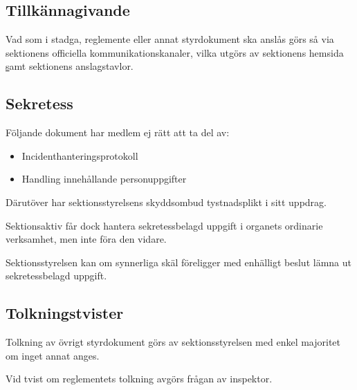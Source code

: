 \documentclass{styrdokument}
\begin{document}
\subsection{Tillkännagivande}
\? Vad som i stadga, reglemente eller annat styrdokument ska anslås görs så via sektionens officiella kommunikationskanaler, vilka utgörs av sektionens hemsida \href{ftek.se} samt sektionens anslagstavlor.

\subsection{Sekretess}
\? Följande dokument har medlem ej rätt att ta del av:
\begin{itemize}
    \item Incidenthanteringsprotokoll
    \item Handling innehållande personuppgifter
\end{itemize}

\? Därutöver har sektionsstyrelsens skyddsombud tystnadsplikt i sitt uppdrag.

\? Sektionsaktiv får dock hantera sekretessbelagd uppgift i organets ordinarie verksamhet, men inte föra den vidare.

\? Sektionsstyrelsen kan om synnerliga skäl föreligger med enhälligt beslut lämna ut sekretessbelagd uppgift.

\subsection{Tolkningstvister}
\? Tolkning av övrigt styrdokument görs av sektionsstyrelsen med enkel majoritet om inget annat anges.

\? Vid tvist om reglementets tolkning avgörs frågan av inspektor.

\end{document}
